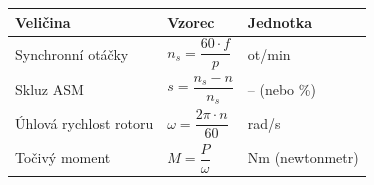 \documentclass[a4paper,10pt]{article}
\begin{document}
\begin{vysvetlenibox}
\begin{center}
\begin{tabularx}{0.97\linewidth}{@{} l l l @{}}
\toprule
\textbf{Veličina} & \textbf{Vzorec} & \textbf{Jednotka} \\
\midrule
Synchronní otáčky & $n_s = \dfrac{60 \cdot f}{p}$ & ot/min \\
Skluz ASM & $s = \dfrac{n_s - n}{n_s}$ & -- (nebo \%) \\
Úhlová rychlost rotoru & $\omega = \dfrac{2\pi \cdot n}{60}$ & rad/s \\
Točivý moment & $M = \dfrac{P}{\omega}$ & Nm (newtonmetr) \\
\bottomrule
\end{tabularx}
\end{center}

\end{vysvetlenibox}
\end{document}

